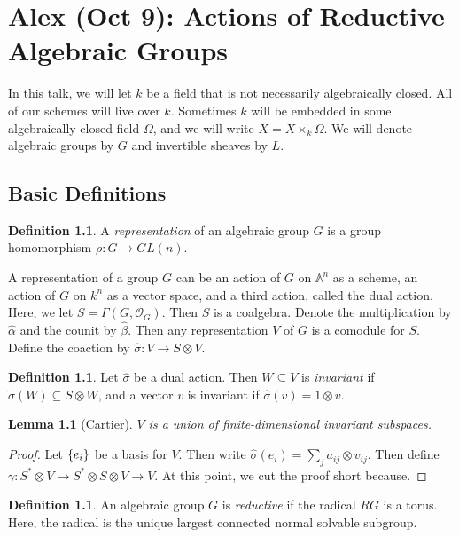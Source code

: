 \documentclass[leqno, openany]{memoir}
\newtheorem{lem}[thm]{Lemma}
\theoremstyle{definition}
\newtheorem{defn}[thm]{Definition}
\theoremstyle{remark}
\theoremstyle{plain}
\theoremstyle{definition}
\theoremstyle{remark}
\newcommand{\A}{\mathbb{A}}
\newcommand{\mc}[1]{\mathcal{#1}}
\newcommand{\ol}[1]{\overline{#1}}
\newcommand{\wt}[1]{\widetilde{#1}}
\newcommand{\wh}[1]{\widehat{#1}}
\begin{document}
\chapter{Alex (Oct 9): Actions of Reductive Algebraic Groups}%
\label{cha:alex_oct_9_actions_of_reductive_algebraic_groups}

In this talk, we will let $k$ be a field that is not necessarily algebraically closed. All of our schemes will live over $k$. Sometimes $k$ will be embedded in some algebraically closed field $\Omega$, and we will write $\ol{X} = X \times_k \Omega$. We will denote algebraic groups by $G$ and invertible sheaves by $L$.

\section{Basic Definitions}%
\label{sec:basic_definitions}

\begin{defn}
    A \textit{representation} of an algebraic group $G$ is a group homomorphism $\rho \colon G \to GL(n)$.  
\end{defn}

A representation of a group $G$ can be an action of $G$ on $\A^n$ as a scheme, an action of $G$ on $k^n$ as a vector space, and a third action, called the dual action. Here, we let $S = \Gamma(G, \mc{O}_G)$. Then $S$ is a coalgebra. Denote the multiplication by $\wh{\alpha}$ and the counit by $\wh{\beta}$. Then any representation $V$ of $G$ is a comodule for $S$. Define the coaction by $\wh{\sigma} \colon V \to S \otimes V$.

\begin{defn}
    Let $\wh{\sigma}$ be a dual action. Then $W \subseteq V$ is \textit{invariant} if $\wt{\sigma}(W) \subseteq S \otimes  W$, and a vector $v$ is invariant if $\wh{\sigma}(v) = 1 \otimes v$. 
\end{defn}

\begin{lem}[Cartier]
    $V$ is a union of finite-dimensional invariant subspaces. 
\end{lem}

\begin{proof}
    Let $\qty{e_i}$ be a basis for $V$. Then write $\wh{\sigma}(e_i) = \sum_j a_{ij} \otimes v_{ij}$. Then define $\gamma \colon S^* \otimes V \to S^* \otimes S \otimes V \to V$. At this point, we cut the proof short because.
\end{proof}

\begin{defn}
    An algebraic group $G$ is \textit{reductive} if the radical $RG$ is a torus. Here, the radical is the unique largest connected normal solvable subgroup. 
\end{defn}
\end{document}
